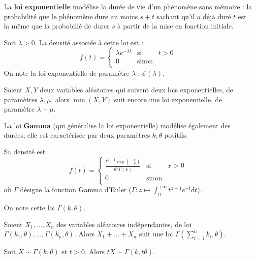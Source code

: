 \documentclass[]{book}
\theoremstyle{definition}
\theoremstyle{definition}
\theoremstyle{definition}
\theoremstyle{remark}
\let\BeginKnitrBlock\begin \let\EndKnitrBlock\end
\begin{document}
\BeginKnitrBlock{example}
\protect\hypertarget{exm:unnamed-chunk-40}{}{\label{exm:unnamed-chunk-40} }La \textbf{loi exponentielle} modélise la durée de vie d'un phénomène sans mémoire : la probabilité que le phénomène dure au moins \(s+t\) sachant qu'il a déjà duré \(t\) est la même que la probabilié de durer \(s\) à partir de la mise en fonction initiale.

Soit \(\lambda > 0\). La densité associée à cette loi est :
\[
f(t) = \left\lbrace
\begin{array}{ccc}
\lambda e^{-\lambda t}  & \mbox{si} & t>0\\
0 & \mbox{sinon} &\\
\end{array}\right.
\]
On note la loi exponentielle de paramètre \(\lambda\) : \(\mathcal{E}(\lambda)\).
\EndKnitrBlock{example}

\BeginKnitrBlock{lemma}
\protect\hypertarget{lem:unnamed-chunk-41}{}{\label{lem:unnamed-chunk-41} }Soient \(X,Y\) deux variables aléatoires qui suivent deux lois exponentielles, de paramètres \(\lambda, \mu\), alors \(\min (X,Y)\) suit encore une loi exponentielle, de paramètre \(\lambda + \mu\).
\EndKnitrBlock{lemma}

\BeginKnitrBlock{example}
\protect\hypertarget{exm:unnamed-chunk-42}{}{\label{exm:unnamed-chunk-42} }La loi \textbf{Gamma} (qui généralise la loi exponentielle) modélise également des durées; elle est caractérisée par deux paramètres \(k,\theta\) positifs.

Sa densité est
\[ f(t) = \left\lbrace
\begin{array}{ccc}
\frac{t^{k-1} \exp \left(-\frac{t}{\theta} \right)}{\theta^k \Gamma (k)}   & \mbox{si} & x>0\\
0 & \mbox{sinon} & \\
\end{array}\right.
\]
où \(\Gamma\) désigne la fonction Gamma d'Euler (\(\Gamma : z \mapsto \int_0^{+\infty} t^{z-1} e^{-t} \mbox{d}t\)).

On note cette loi \(\Gamma(k,\theta)\).
\EndKnitrBlock{example}

\BeginKnitrBlock{lemma}
\protect\hypertarget{lem:unnamed-chunk-43}{}{\label{lem:unnamed-chunk-43} }Soient \(X_1, \ldots, X_n\) des variables aléatoires indépendantes, de loi \(\Gamma(k_1,\theta),\ldots,\Gamma(k_n,\theta)\). Alors \(X_1+\ldots+X_n\) suit une loi \(\Gamma(\sum_{i=1}^n k_i,\theta)\).
\EndKnitrBlock{lemma}

\BeginKnitrBlock{lemma}
\protect\hypertarget{lem:unnamed-chunk-44}{}{\label{lem:unnamed-chunk-44} }Soit \(X \sim \Gamma(k,\theta)\) et \(t>0\). Alors \(tX \sim \Gamma(k,t \theta)\).
\EndKnitrBlock{lemma}
\end{document}
